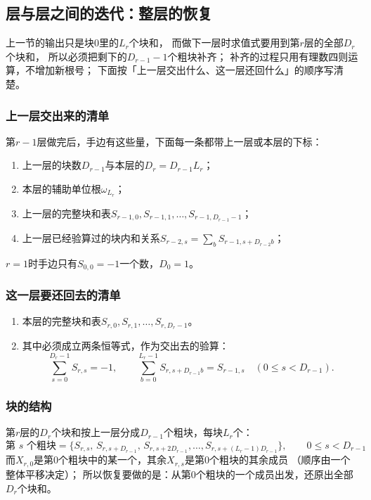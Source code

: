 \documentclass[UTF8,a4paper,11pt]{ctexart}
\begin{document}
\subsection{层与层之间的迭代：整层的恢复}
上一节的输出只是块$0$里的$L_r$个块和，
而做下一层时求值式要用到第$r$层的全部$D_r$个块和，
所以必须把剩下的$D_{r-1}-1$个粗块补齐；
补齐的过程只用有理数四则运算，不增加新根号；
下面按「上一层交出什么、这一层还回什么」的顺序写清楚。

\subsubsection{上一层交出来的清单}
第$r-1$层做完后，手边有这些量，下面每一条都带上一层或本层的下标：
\begin{enumerate}
 \item 上一层的块数$D_{r-1}$与本层的$D_r=D_{r-1}L_r$；
 \item 本层的辅助单位根$\omega_{L_r}$；
 \item 上一层的完整块和表$S_{r-1,0},S_{r-1,1},\dots,S_{r-1,D_{r-1}-1}$；
 \item 上一层已经验算过的块内和关系$S_{r-2,s}=\sum_bS_{r-1,s+D_{r-2}b}$；
\end{enumerate}
$r=1$时手边只有$S_{0,0}=-1$一个数，$D_0=1$。

\subsubsection{这一层要还回去的清单}
\begin{enumerate}
 \item 本层的完整块和表$S_{r,0},S_{r,1},\dots,S_{r,D_r-1}$。
 \item 其中必须成立两条恒等式，作为交出去的验算：
       \[
        \sum_{s=0}^{D_r-1}S_{r,s}=-1,
        \qquad
        \sum_{b=0}^{L_r-1}S_{r,s+D_{r-1}b}=S_{r-1,s}\quad(0\le s<D_{r-1}).
       \]
\end{enumerate}

\subsubsection{块的结构}
第$r$层的$D_r$个块和按上一层分成$D_{r-1}$个粗块，每块$L_r$个：
\[
 \text{第 }s\text{ 个粗块}=\{S_{r,s},\,S_{r,s+D_{r-1}},\,S_{r,s+2D_{r-1}},\dots,
 S_{r,s+(L_r-1)D_{r-1}}\},\qquad 0\le s<D_{r-1}
\]
而$X_{r,0}$是第$0$个粗块中的某一个，其余$X_{r,s}$是第$0$个粗块的其余成员
（顺序由一个整体平移决定）；
所以恢复要做的是：从第$0$个粗块的一个成员出发，还原出全部$D_r$个块和。
\end{document}

